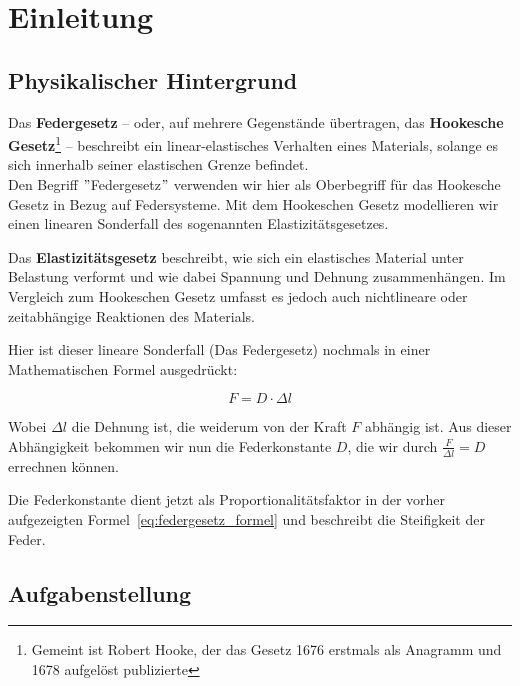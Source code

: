 \documentclass[../main.tex]{subfiles} %
\begin{document}
\section{Einleitung}\label{sec:einleitung}

    \subsection{Physikalischer Hintergrund}\label{subsec:physikalischer-hintergrund}
        Das \textbf{Federgesetz} – oder, auf mehrere Gegenstände übertragen, das \textbf{Hookesche Gesetz}\footnote{Gemeint ist Robert Hooke, der das Gesetz 1676 erstmals als Anagramm und 1678 aufgelöst publizierte} – beschreibt ein linear-elastisches Verhalten eines Materials, solange es sich innerhalb seiner elastischen Grenze befindet.
        \\ Den Begriff \("\)Federgesetz\("\) verwenden wir hier als Oberbegriff für das Hookesche Gesetz in Bezug auf Federsysteme.
        Mit dem Hookeschen Gesetz modellieren wir einen linearen Sonderfall des sogenannten Elastizitätsgesetzes.
        \begin{tcolorbox}[title=Ausholung für das Elastizitätsgesetz]
            Das \textbf{Elastizitätsgesetz} beschreibt, wie sich ein elastisches Material unter Belastung verformt und wie dabei Spannung und Dehnung zusammenhängen.
            Im Vergleich zum Hookeschen Gesetz umfasst es jedoch auch nichtlineare oder zeitabhängige Reaktionen des Materials.
        \end{tcolorbox}
        \noindent Hier ist dieser lineare Sonderfall (Das Federgesetz) nochmals in einer Mathematischen Formel ausgedrückt:

        \begin{equation}
            F = D \cdot \Delta l
        \label{eq:federgesetz_formel}
        \end{equation}

        \noindent Wobei ${\Delta l}$ die Dehnung ist, die weiderum von der Kraft ${F}$ abhängig ist.
        Aus dieser Abhängigkeit bekommen wir nun die Federkonstante ${D}$, die wir durch ${\frac{F}{\Delta l} = D}$ errechnen können.

        \noindent Die Federkonstante dient jetzt als Proportionalitätsfaktor in der vorher aufgezeigten Formel~\ref{eq:federgesetz_formel} und beschreibt die Steifigkeit der Feder.


    \subsection{Aufgabenstellung}\label{subsec:aufgabenstellung}
\end{document}
